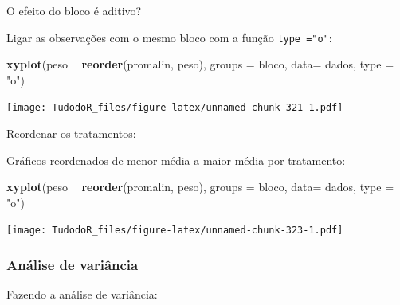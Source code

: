 \documentclass[
]{book}
\newenvironment{Shaded}{\begin{snugshade}}{\end{snugshade}}
\newcommand{\DataTypeTok}[1]{\textcolor[rgb]{0.13,0.29,0.53}{#1}}
\newcommand{\KeywordTok}[1]{\textcolor[rgb]{0.13,0.29,0.53}{\textbf{#1}}}
\newcommand{\NormalTok}[1]{#1}
\newcommand{\OperatorTok}[1]{\textcolor[rgb]{0.81,0.36,0.00}{\textbf{#1}}}
\newcommand{\StringTok}[1]{\textcolor[rgb]{0.31,0.60,0.02}{#1}}
\begin{document}
O efeito do bloco é aditivo?

Ligar as observações com o mesmo bloco com a função \texttt{type\ ="o"}:

\begin{Shaded}
\begin{Highlighting}[]
\KeywordTok{xyplot}\NormalTok{(peso }\OperatorTok{~}\StringTok{ }\KeywordTok{reorder}\NormalTok{(promalin, peso), }
        \DataTypeTok{groups =}\NormalTok{ bloco, }
        \DataTypeTok{data=}\NormalTok{ dados,}
        \DataTypeTok{type =} \StringTok{"o"}\NormalTok{)}
\end{Highlighting}
\end{Shaded}

\texttt{[image: TudodoR\_files/figure-latex/unnamed-chunk-321-1.pdf]}

Reordenar os tratamentos:

\begin{Shaded}
\end{Shaded}

Gráficos reordenados de menor média a maior média por tratamento:

\begin{Shaded}
\begin{Highlighting}[]
\KeywordTok{xyplot}\NormalTok{(peso }\OperatorTok{~}\StringTok{ }\KeywordTok{reorder}\NormalTok{(promalin, peso), }
        \DataTypeTok{groups =}\NormalTok{ bloco, }
        \DataTypeTok{data=}\NormalTok{ dados,}
        \DataTypeTok{type =} \StringTok{"o"}\NormalTok{)}
\end{Highlighting}
\end{Shaded}

\texttt{[image: TudodoR\_files/figure-latex/unnamed-chunk-323-1.pdf]}

\hypertarget{anuxe1lise-de-variuxe2ncia-1}{%
\subsubsection{Análise de variância}\label{anuxe1lise-de-variuxe2ncia-1}}

Fazendo a análise de variância:
\end{document}
